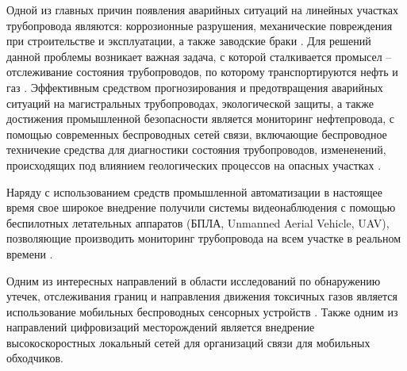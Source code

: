 Одной из главных причин появления аварийных ситуаций на линейных участках трубопровода являются: коррозионные разрушения, механические повреждения при строительстве и эксплуатации, а также заводские браки \cite{Deineko2018_alone}. Для решений данной проблемы возникает важная задача, с которой сталкивается промысел -- отслеживание состояния трубопроводов, по которому транспортируются нефть и газ \cite{Aalsalem2018}. Эффективным средством прогнозирования и предотвращения аварийных ситуаций на магистральных трубопроводах, экологической защиты, а также  достижения промышленной безопасности является мониторинг нефтепровода, с помощью современных беспроводных сетей связи, включающие беспроводное техничекие средства для диагностики состояния трубопроводов, измененений, происходящих под влиянием геологических процессов на опасных участках \cite{Krzyszton2021,Mehmood2016, Lin2019, Adegboye2019, Lin2019}. 

Наряду с использованием средств промышленной автоматизации в настоящее время свое широкое внедрение получили системы видеонаблюдения с помощью беспилотных летательных аппаратов  (БПЛА, Unmanned Aerial Vehicle, UAV), позволяющие производить мониторинг трубопровода на всем участке в реальном времени \cite{Fedorova2020, Aljuaid2020, Adegboye2019, Gomez2017, Fawzi2019}.

Одним из интересных направлений в области исследований по обнаружению утечек, отслеживания границ и направления движения токсичных газов является использование мобильных беспроводных сенсорных устройств \cite{Krzyszton2021}. Также одним из направлений цифровизаций месторождений является внедрение высокоскоростных локальный сетей для организаций связи для мобильных обходчиков. 



